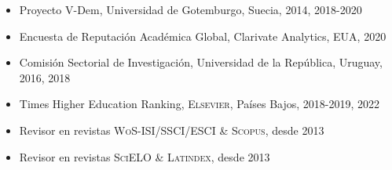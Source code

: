 





\begin{publications}

\begin{itemize}
\item{\small Proyecto V-Dem, Universidad de Gotemburgo, Suecia, 2014, 2018-2020}
\item{\small Encuesta de Reputación Académica Global, Clarivate Analytics, EUA, 2020}
\item{\small Comisión Sectorial de Investigación, Universidad de la Rep\'ublica, Uruguay, 2016, 2018}
\item{\small Times Higher Education Ranking, {\scshape Elsevier}, Países Bajos, 2018-2019, 2022}
\item{\small Revisor en revistas {\scshape WoS-ISI/SSCI/ESCI} \& {\scshape Scopus}, desde 2013}
\item{\small Revisor en revistas {\scshape SciELO} \& {\scshape Latindex}, desde 2013}
\end{itemize}

\vspace{1mm}
\end{publications}
